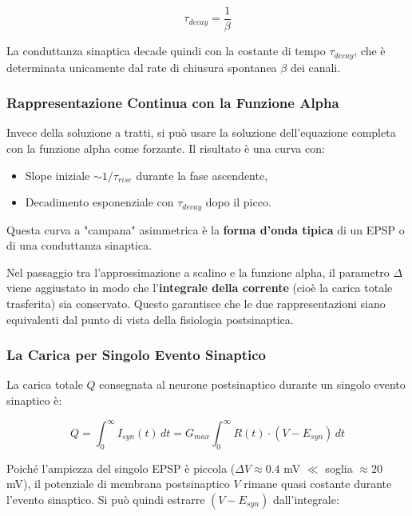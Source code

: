 \begin{equation}
\tau_{decay} = \frac{1}{\beta}
\end{equation}

La conduttanza sinaptica decade quindi con la costante di tempo $\tau_{decay}$, che è determinata unicamente dal rate di chiusura spontanea $\beta$ dei canali.

\subsubsection{Rappresentazione Continua con la Funzione Alpha}

Invece della soluzione a tratti, si può usare la soluzione dell'equazione completa con la funzione alpha come forzante. Il risultato è una curva con:
\begin{itemize}
    \item Slope iniziale $\sim 1/\tau_{rise}$ durante la fase ascendente,
    \item Decadimento esponenziale con $\tau_{decay}$ dopo il picco.
\end{itemize}

Questa curva a "campana" asimmetrica è la \textbf{forma d'onda tipica} di un EPSP o di una conduttanza sinaptica.

\begin{tcolorbox}[colback=gray!5, colframe=gray!40, arc=2mm, boxrule=0.5pt]
Nel passaggio tra l'approssimazione a scalino e la funzione alpha, il parametro $\Delta$ viene aggiustato in modo che l'\textbf{integrale della corrente} (cioè la carica totale trasferita) sia conservato. Questo garantisce che le due rappresentazioni siano equivalenti dal punto di vista della fisiologia postsinaptica.
\end{tcolorbox}




\subsubsection{La Carica per Singolo Evento Sinaptico}

La carica totale $Q$ consegnata al neurone postsinaptico durante un singolo evento sinaptico è:

\begin{equation}
Q = \int_0^\infty I_{syn}(t) \, dt = G_{max} \int_0^\infty R(t) \cdot (V - E_{syn}) \, dt
\end{equation}

Poiché l'ampiezza del singolo EPSP è piccola ($\Delta V \approx 0.4$ mV $\ll$ soglia $\approx 20$ mV), il potenziale di membrana postsinaptico $V$ rimane quasi costante durante l'evento sinaptico. Si può quindi estrarre $(V - E_{syn})$ dall'integrale:

